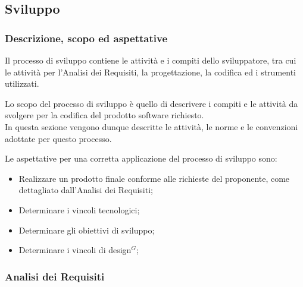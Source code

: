 \subsection{Sviluppo}

\subsubsection{Descrizione, scopo ed aspettative}

Il processo di sviluppo contiene le attività e i compiti dello sviluppatore, tra cui le attività per l’Analisi dei Requisiti, la progettazione, la codifica ed i strumenti utilizzati.

Lo scopo del processo di sviluppo è quello di descrivere i compiti e le attività da svolgere per la codifica del prodotto software richiesto. \\
In questa sezione vengono dunque descritte le attività, le norme e le convenzioni adottate per questo processo.

Le aspettative per una corretta applicazione del processo di sviluppo sono:
\begin{itemize}
    \item Realizzare un prodotto finale conforme alle richieste del proponente, come dettagliato dall'Analisi dei Requisiti;
    \item Determinare i vincoli tecnologici;
    \item Determinare gli obiettivi di sviluppo;
    \item Determinare i vincoli di design$^{G}$;
\end{itemize}
\subsubsection{Analisi dei Requisiti}






 